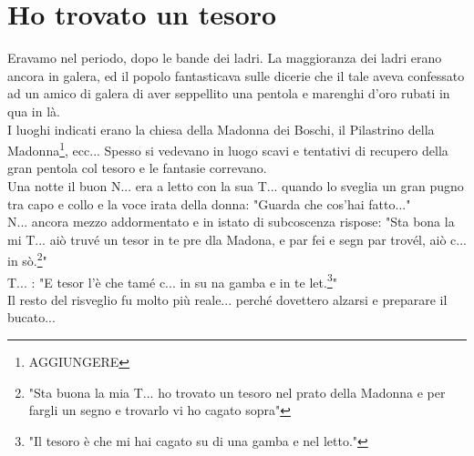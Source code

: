 \documentclass[10pt]{memoir} %
\begin{document}

\chapter{Ho trovato un tesoro}

Eravamo nel periodo, dopo le bande dei ladri. La maggioranza dei ladri erano ancora in galera, ed il popolo fantasticava sulle dicerie che il tale aveva confessato ad un amico di galera di aver seppellito una pentola e marenghi d'oro rubati in qua in là.\\
I luoghi indicati erano la chiesa della Madonna dei Boschi, il Pilastrino della Madonna\footnote{AGGIUNGERE}, ecc... Spesso si vedevano in luogo scavi e tentativi di recupero della gran pentola col tesoro e le fantasie correvano.\\
Una notte il buon N\:.\:.\:. era a letto con la sua T\:.\:.\:. quando lo sveglia un gran pugno tra capo e collo e la voce irata della donna: "Guarda che cos'hai fatto..."\\
N\:.\:.\:. ancora mezzo addormentato e in istato di subcoscenza rispose: "Sta bona la mi T\:.\:.\:. aiò truvé un tesor in te pre dla Madona, e par fei e segn par trovél, aiò c... in sò.\footnote{"Sta buona la mia T\:.\:.\:. ho trovato un tesoro nel prato della Madonna e per fargli un segno e trovarlo vi ho cagato sopra"}"\\
T\:.\:.\:. : "E tesor l'è che tamé c...  in su na gamba e in te let.\footnote{"Il tesoro è che mi hai cagato su di una gamba e nel letto."}"\\
Il resto del risveglio fu molto più reale... perché dovettero alzarsi e preparare il bucato...


\end{document}
